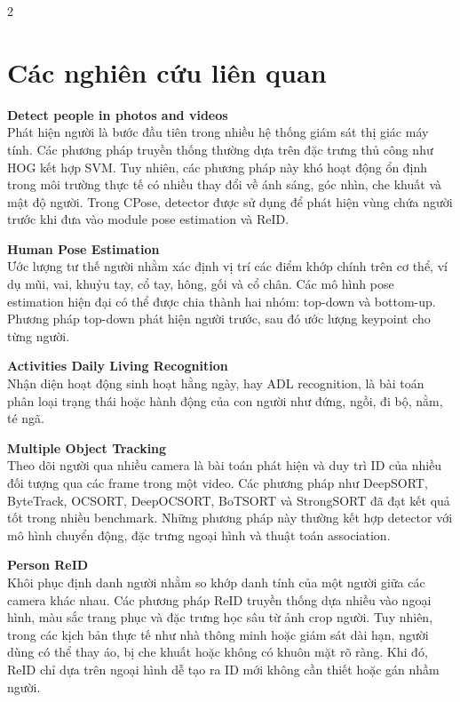 \documentclass[a4paper, twoside, 12pt]{article}
\begin{document}
\vspace{0.2cm}
\begin{multicols}{2}
\section{Các nghiên cứu liên quan}
\vspace{-0.6cm}
\hspace*{0.5cm}\textbf{Detect people in photos and videos}\\
Phát hiện người là bước đầu tiên trong nhiều hệ thống giám sát thị giác máy tính. Các phương pháp truyền thống thường dựa trên đặc trưng thủ công như HOG kết hợp SVM. Tuy nhiên, các phương pháp này khó hoạt động ổn định trong môi trường thực tế có nhiều thay đổi về ánh sáng, góc nhìn, che khuất và mật độ người. Trong CPose, detector được sử dụng để phát hiện vùng chứa người trước khi đưa vào module pose estimation và ReID.

\textbf{Human Pose Estimation}\\
Ước lượng tư thế người nhằm xác định vị trí các điểm khớp chính trên cơ thể, ví dụ mũi, vai, khuỷu tay, cổ tay, hông, gối và cổ chân. Các mô hình pose estimation hiện đại có thể được chia thành hai nhóm: top-down và bottom-up. Phương pháp top-down phát hiện người trước, sau đó ước lượng keypoint cho từng người. 

\textbf{Activities Daily Living Recognition}\\
Nhận diện hoạt động sinh hoạt hằng ngày, hay ADL recognition, là bài toán phân loại trạng thái hoặc hành động của con người như đứng, ngồi, đi bộ, nằm, té ngã. 

\textbf{Multiple Object Tracking }\\
Theo dõi người qua nhiều camera là bài toán phát hiện và duy trì ID của nhiều đối tượng qua các frame trong một video. Các phương pháp như DeepSORT, ByteTrack, OCSORT, DeepOCSORT, BoTSORT và StrongSORT đã đạt kết quả tốt trong nhiều benchmark. Những phương pháp này thường kết hợp detector với mô hình chuyển động, đặc trưng ngoại hình và thuật toán association.

\textbf{Person ReID}\\
Khôi phục định danh người nhằm so khớp danh tính của một người giữa các camera khác nhau. Các phương pháp ReID truyền thống dựa nhiều vào ngoại hình, màu sắc trang phục và đặc trưng học sâu từ ảnh crop người. Tuy nhiên, trong các kịch bản thực tế như nhà thông minh hoặc giám sát dài hạn, người dùng có thể thay áo, bị che khuất hoặc không có khuôn mặt rõ ràng. Khi đó, ReID chỉ dựa trên ngoại hình dễ tạo ra ID mới không cần thiết hoặc gán nhầm người.


\end{multicols}
\end{document}
